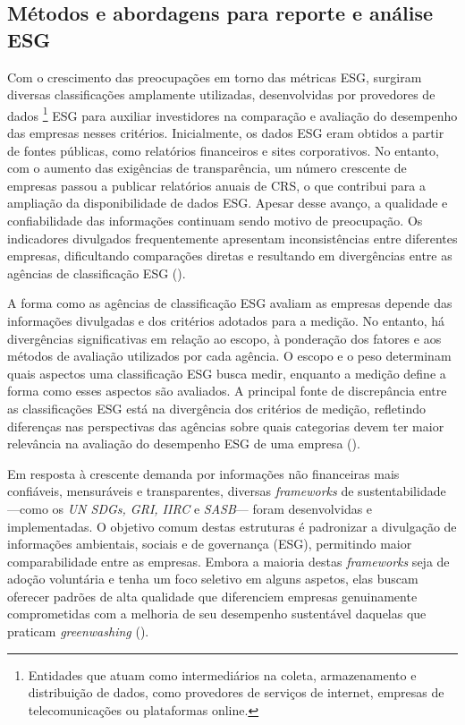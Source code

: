 
\subsection{Métodos e abordagens para reporte e análise ESG}
\label{subsec: MARAESG}

Com o crescimento das preocupações em torno das métricas \gls{ESG}, surgiram diversas classificações amplamente utilizadas, desenvolvidas por provedores de dados \footnote{Entidades que atuam como intermediários na coleta, armazenamento e distribuição de dados, como provedores de serviços de internet, empresas de telecomunicações ou plataformas online.} ESG para auxiliar investidores na comparação e avaliação do desempenho das empresas nesses critérios. Inicialmente, os dados ESG eram obtidos a partir de fontes públicas, como relatórios financeiros e sites corporativos. No entanto, com o aumento das exigências de transparência, um número crescente de empresas passou a publicar relatórios anuais de \gls{CRS}, o que contribui para a ampliação da disponibilidade de dados ESG. Apesar desse avanço, a qualidade e confiabilidade das informações continuam sendo motivo de preocupação. Os indicadores divulgados frequentemente apresentam inconsistências entre diferentes empresas, dificultando comparações diretas e resultando em divergências entre as agências de classificação ESG (\cite{Rau2024}).

A forma como as agências de classificação ESG avaliam as empresas depende das informações divulgadas e dos critérios adotados para a medição. No entanto, há divergências significativas em relação ao escopo, à ponderação dos fatores e aos métodos de avaliação utilizados por cada agência. O escopo e o peso determinam quais aspectos uma classificação ESG busca medir, enquanto a medição define a forma como esses aspectos são avaliados. A principal fonte de discrepância entre as classificações ESG está na divergência dos critérios de medição, refletindo diferenças nas perspectivas das agências sobre quais categorias devem ter maior relevância na avaliação do desempenho ESG de uma empresa (\cite{Berg2022}).

Em resposta à crescente demanda por informações não financeiras mais confiáveis, mensuráveis e transparentes, diversas \textit{frameworks} de sustentabilidade —como os \textit{UN SDGs, GRI, IIRC} e \textit{SASB}— foram desenvolvidas e implementadas. O objetivo comum destas estruturas é padronizar a divulgação de informações ambientais, sociais e de governança (ESG), permitindo maior comparabilidade entre as empresas. Embora a maioria destas \textit{frameworks} seja de adoção voluntária e tenha um foco seletivo em alguns aspetos, elas buscam oferecer padrões de alta qualidade que diferenciem empresas genuinamente comprometidas com a melhoria de seu desempenho sustentável daquelas que praticam \textit{greenwashing} (\cite{Cruz2023}).

